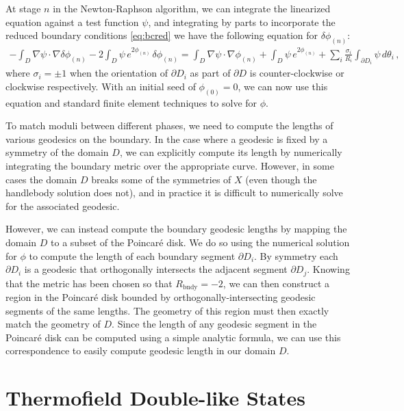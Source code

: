 \documentclass[letterpaper,12pt]{article}
\newcommand{\ban}[1]{\begin{align}#1\end{align}}
\newcommand{\Tr}{\text{Tr}}
\begin{document}
At stage $n$ in the Newton-Raphson algorithm, we can integrate the linearized equation against a test function $\psi$, and integrating by parts to incorporate the reduced boundary conditions \eqref{eq:bcred} we have the following equation for $\delta \phi_{(n)}$:
\ban{
- \int_D \nabla \psi\cdot \nabla \delta \phi_{(n)}- 2 \int_D \psi \, e^{2\phi_{(n)}} \, \delta\phi_{(n)} = \int_D \nabla \psi \cdot \nabla \phi_{(n)} + \int_D \psi \, e^{2\phi_{(n)}} + \sum_{i}\frac {\sigma_i}{R_i} \int_{\partial D_i} {\psi}\, d \theta_i \, ,
}
where $\sigma_i = \pm 1$ when the orientation of $\partial D_i$ as part of $\partial D$ is counter-clockwise or clockwise respectively. With an initial seed of $\phi_{(0)}=0$, we can now use this equation and standard finite element techniques to solve for $\phi$.

To match moduli between different phases, we need to compute the lengths of various geodesics on the boundary. In the case where a geodesic is fixed by a symmetry of the domain $D$, we can explicitly compute its length by numerically integrating the boundary metric over the appropriate curve. However, in some cases the domain $D$ breaks some of the symmetries of $X$ (even though the handlebody solution does not), and in practice it is difficult to numerically solve for the associated geodesic.

However, we can instead compute the boundary geodesic lengths by mapping the domain $D$ to a subset of the Poincar\'e disk. We do so using the numerical solution for $\phi$ to compute the length of each boundary segment $\partial D_i$. By symmetry each $\partial D_i$ is a geodesic that orthogonally intersects the adjacent segment $\partial D_j$. Knowing that the metric has been chosen so that $R_\text{bndy} =-2$, we can then construct a region in the Poincar\'e disk bounded by orthogonally-intersecting geodesic segments of the same lengths. The geometry of this region must then exactly match the geometry of $D$. Since the length of any geodesic segment in the Poincar\'e disk can be computed using a simple analytic formula, we can use this correspondence to easily compute geodesic length in our domain $D$.




\section{Thermofield Double-like States}%
\label{section:replica}
\end{document}
